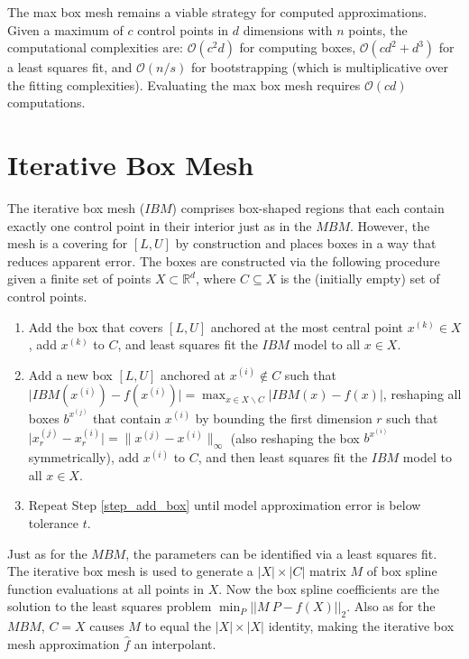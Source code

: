 The max box mesh remains a viable strategy for computed approximations. Given a maximum of $c$ control points in $d$ dimensions with $n$ points, the computational complexities are: $\mathcal{O}(c^2 d)$ for computing boxes, $\mathcal{O}(c d^2 + d^3)$ for a least squares fit, and $\mathcal{O}(n / s)$ for bootstrapping (which is multiplicative over the fitting complexities). Evaluating the max box mesh requires $\mathcal{O}(c d)$ computations.

\section{Iterative Box Mesh}

The iterative box mesh ($IBM$) comprises box-shaped regions that each contain exactly one control point in their interior just as in the $MBM$. However, the mesh is a covering for $[L,U]$ by construction and places boxes in a way that reduces apparent error. The boxes are constructed via the following procedure given a finite set of points $X \subset \mathbb{R}^d$, where $C \subseteq X$ is the (initially empty) set of control points.
\begin{enumerate}
\item Add the box that covers $[L,U]$ anchored at the most central point $x^{(k)} \in X$, add $x^{(k)}$ to $C$, and least squares fit the $IBM$ model to all $x \in X$.
\item Add a new box $[L,U]$ anchored at $x^{(i)} \notin C$ such that $\bigl| IBM(x^{(i)}) - f(x^{(i)}) \bigr| = \max_{x \in X \backslash C} \bigl| IBM(x) - f(x) \bigr|$, reshaping all boxes $b^{x^{(j)}}$ that contain $x^{(i)}$ by bounding the first dimension $r$ such that $\bigl| x^{(j)}_r - x^{(i)}_r \bigr| = \bigl\| x^{(j)} - x^{(i)} \bigr\|_\infty$ (also reshaping the box $b^{x^{(i)}}$ symmetrically), add $x^{(i)}$ to $C$, and then least squares fit the $IBM$ model to all $x \in X$. \label{step_add_box}
\item Repeat Step \ref{step_add_box} until model approximation error is below tolerance $t$.
\end{enumerate}

Just as for the $MBM$, the parameters can be identified via a least squares fit. The iterative box mesh is used to generate a $|X| \times |C|$ matrix $M$ of box spline function evaluations at all points in $X$. Now the box spline coefficients are the solution to the least squares problem $\min_P \bigl|\bigl| M\ P - f(X) \bigr|\bigr|_2$. Also as for the $MBM$, $C = X$ causes $M$ to equal the $|X| \times |X|$ identity, making the iterative box mesh approximation $\hat f$ an interpolant.


